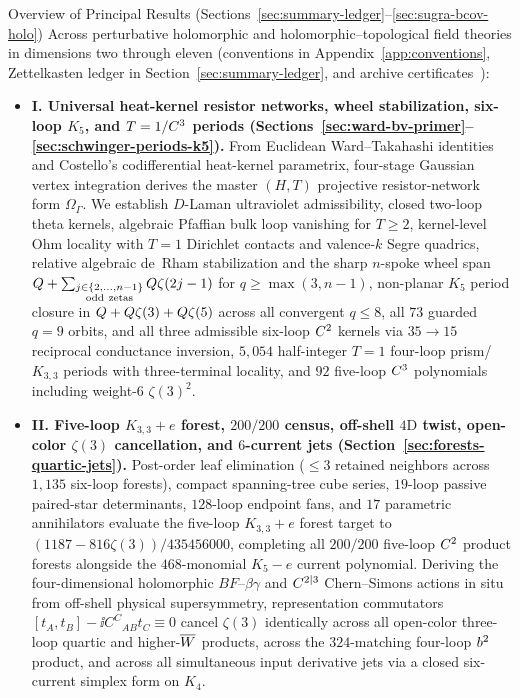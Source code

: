 \begin{summaryblock}{Overview of Principal Results (Sections~\ref{sec:summary-ledger}--\ref{sec:sugra-bcov-holo})}
Across perturbative holomorphic and holomorphic--topological field theories in dimensions two through eleven (conventions in Appendix~\ref{app:conventions}, Zettelkasten ledger in Section~\ref{sec:summary-ledger}, and archive certificates~\cite{Repo9e833c8}):
\begin{itemize}[leftmargin=*]
  \item \textbf{I. Universal heat-kernel resistor networks, wheel stabilization, six-loop $K_5$, and $T=1/C^3$ periods (Sections~\ref{sec:ward-bv-primer}--\ref{sec:schwinger-periods-k5}).} From Euclidean Ward--Takahashi identities and Costello's codifferential heat-kernel parametrix, four-stage Gaussian vertex integration derives the master $(H,T)$ projective resistor-network form $\Omega_\Gamma$. We establish $D$-Laman ultraviolet admissibility, closed two-loop theta kernels, algebraic Pfaffian bulk loop vanishing for $T \ge 2$, kernel-level Ohm locality with $T=1$ Dirichlet contacts and valence-$k$ Segre quadrics, relative algebraic de~Rham stabilization and the sharp $n$-spoke wheel span $Q + \sum_{\substack{j \in \{2,\dots,n-1\}\\\mathrm{odd\ zetas}}} Q\zeta(2j-1)$ for $q \ge \max(3,n-1)$, non-planar $K_5$ period closure in $Q + Q\zeta(3) + Q\zeta(5)$ across all convergent $q \le 8$, all $73$ guarded $q=9$ orbits, and all three admissible six-loop $C^2$ kernels via $35 \to 15$ reciprocal conductance inversion, $5{,}054$ half-integer $T=1$ four-loop prism/$K_{3,3}$ periods with three-terminal locality, and $92$ five-loop $C^3$ polynomials including weight-$6$ $\zeta(3)^2$.
  \item \textbf{II. Five-loop $K_{3,3}+e$ forest, $200/200$ census, off-shell $4\mathrm{D}$ twist, open-color $\zeta(3)$ cancellation, and $6$-current jets (Section~\ref{sec:forests-quartic-jets}).} Post-order leaf elimination ($\le 3$ retained neighbors across $1{,}135$ six-loop forests), compact spanning-tree cube series, $19$-loop passive paired-star determinants, $128$-loop endpoint fans, and $17$ parametric annihilators evaluate the five-loop $K_{3,3}+e$ forest target to $(1187 - 816\zeta(3))/435456000$, completing all $200/200$ five-loop $C^2$ product forests alongside the $468$-monomial $K_5-e$ current polynomial. Deriving the four-dimensional holomorphic $BF$--$\beta\gamma$ and $C^{2|3}$ Chern--Simons actions in situ from off-shell physical supersymmetry, representation commutators $[t_A,t_B] - \ii C^C{}_{AB}t_C \equiv 0$ cancel $\zeta(3)$ identically across all open-color three-loop quartic and higher-$\overline{W}$ products, across the $324$-matching four-loop $b^2$ product, and across all simultaneous input derivative jets via a closed six-current simplex form on $K_4$.

\end{itemize}
\end{summaryblock}
